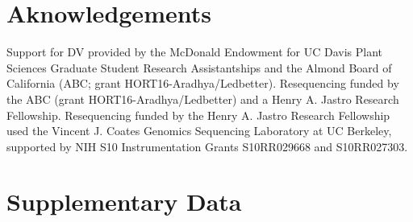 \documentclass[12pt]{article}
\begin{document}
\section*{Aknowledgements}
Support for DV provided by the McDonald Endowment for UC Davis Plant Sciences Graduate Student Research Assistantships and the Almond Board of California (ABC; grant HORT16-Aradhya/Ledbetter). Resequencing funded by the ABC (grant HORT16-Aradhya/Ledbetter) and a Henry A. Jastro Research Fellowship. Resequencing funded by the Henry A. Jastro Research Fellowship used the Vincent J. Coates Genomics Sequencing Laboratory at UC Berkeley, supported by NIH S10 Instrumentation Grants S10RR029668 and S10RR027303.
\section*{Supplementary Data}
\end{document}
